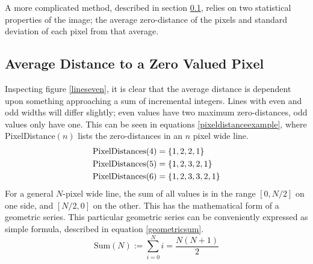 \documentclass[../main.tex]{subfiles}
\begin{document}
  A more complicated method, described in section \ref{zerodistsec}, relies on two statistical properties of the image;
     the average zero-distance of the pixels and standard deviation of each pixel from that average.
  \subsection{Average Distance to a Zero Valued Pixel}
    \label{zerodistsec}
    Inspecting figure \ref{lineseven}, it is clear that the average distance is dependent upon something approaching a sum of incremental integers.
    Lines with even and odd widths will differ slightly; even values have two maximum zero-distances, odd values only have one.
    This can be seen in equations \ref{pixeldistanceexample}, where PixelDistance$(n)$ lists the zero-distances in an $n$ pixel wide line.
    \begin{align}
      \text{PixelDistances}(4) &= \{1,2,2,1\}\notag\\
      \text{PixelDistances}(5) &= \{1,2,3,2,1\}\notag\\
      \text{PixelDistances}(6) &= \{1,2,3,3,2,1\}
      \label{pixeldistanceexample}
    \end{align}
    For a general $N$-pixel wide line, the sum of all values is in the range $[0,N/2]$ on one side, and $[N/2,0]$ on the other.
    This has the mathematical form of a geometric series.
    This particular geometric series can be conveniently expressed as simple formula, described in equation \ref{geometricsum}.
    \begin{equation}
      \text{Sum}(N):=\sum_{i=0}^{N} i = \frac{N(N+1)}{2}
      \label{geometricsum}
    \end{equation}
  
\end{document}
